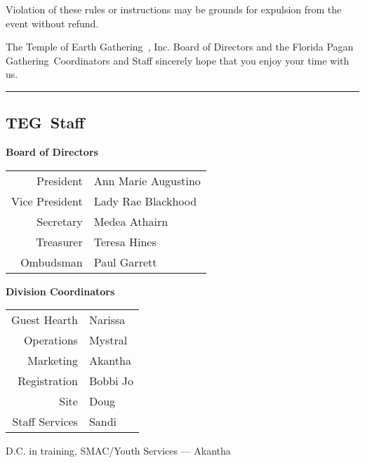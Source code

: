 \documentclass[9pt,twoside,openright,final,article]{memoir}
\def\teg{{\hminfamily TEG\ }}
\def\FPG{{\beltanefamily Florida Pagan Gathering\ }}
\def\TEG{{\hminfamily Temple of Earth Gathering\/\ }}
\let\oldsection=\section
\renewcommand{\section}[1]{%
  \vspace{3pt}%
  \needspace{1in}%
  { \hrule } \nopagebreak %
  \begin{center}\oldsection{#1}\end{center}\nopagebreak{}}
\renewcommand{\subsection}[1]{%
  \vspace{6pt}%
  \needspace{1.25in}%
  \begin{center}\textbf{\Large \beltanefamily #1}\end{center}

  \nopagebreak}
\begin{document}
{\Large Violation of these rules or instructions may be grounds for
  expulsion from the event without refund. }


\vspace{16pt}

{\Large The \TEG, Inc. Board of Directors and the \FPG Coordinators
  and Staff sincerely hope that you enjoy your time with us. }

\vspace{16pt}



\section{\teg Staff}

\begin{multicols}{2}

  \subsection{\teg Board of Directors}
  \begin{center}
    \begin{tabular}{rl}
      President & Ann Marie Augustino \\
      Vice President & Lady Rae Blackhood \\
      Secretary & Medea Athairn \\
      Treasurer & Teresa Hines \\
      Ombudsman & Paul Garrett \\
    \end{tabular}
  \end{center}

  \subsection{Division Coordinators}
  \begin{center}
    \begin{tabular}{rl}
      Guest Hearth      & Narissa \\
      Operations        & Mystral \\
      Marketing         & Akantha \\
      Registration      & Bobbi Jo \hspace{1in} \\
      Site              & Doug \\
      Staff Services    & Sandi \\
    \end{tabular}
    {\footnotesize D.C. in training, SMAC/Youth Services --- Akantha}
  \end{center}


\end{multicols}
\end{document}
